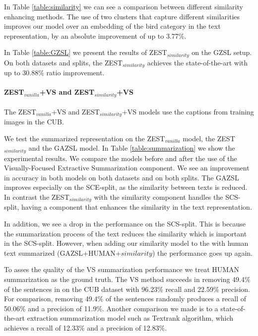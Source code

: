 \documentclass[11pt,a4paper]{article}
\begin{document}
In Table \ref{table:similarity} we can see a comparison between different similarity enhancing methods. The use of two clusters that capture different similarities improves our model over an embedding of the bird category in the text representation, by an absolute improvement of up to 3.77\%.
\par

In Table \ref{table:GZSL} we present the results of ZEST$_{similarity}$ on the GZSL setup. On both datasets and splits, the ZEST$_{similarity}$ achieves the state-of-the-art with up to 30.88\% ratio improvement.

\paragraph{ZEST$_{vanilla}$+VS and ZEST$_{similarity}$+VS }
The ZEST$_{vanilla}$+VS and  ZEST$_{similarity}$+VS models use the captions from training images in the CUB. 

We test the summarized representation on the ZEST$_{vanilla}$ model, the ZEST$_{similarity}$ and the GAZSL \citep{zhu2018generative} model. In Table \ref{table:summarization} we show the experimental results. We compare the models before and after the use of the Visually-Focused  Extractive Summarization component. We see an improvement in accuracy in both models on both datasets and on both splits. The GAZSL improves especially on the SCE-split, as the similarity between texts is reduced. In contrast the ZEST$_{similarity}$ with the similarity component handles the SCS-split, having a component that enhances the similarity in the text representation.  \par

In addition, we see a drop in the \citep{zhu2018generative} performance on the SCS-split. This is because the summarization process of the text reduces the similarity which is important in the SCS-split. However, when adding our similarity model to the \citep{zhu2018generative} with human text summarized (GAZSL+HUMAN+$similarity$) the performance goes up again.
\par  

To asses the quality of the VS summarization performance we treat HUMAN summarization as the ground truth. The VS method succeeds in removing 49.4\% of the sentences in on the CUB dataset with 96.23\% recall and 22.59\% precision. For comparison, removing 49.4\% of the sentences randomly produces a recall of 50.06\% and a precision of 11.9\%.
Another comparison we made is to a state-of-the-art extraction summarization model such as  Textrank \citep{mihalcea2004textrank} algorithm, which achieves a recall of 12.33\% and a precision of 12.83\%.
\end{document}
